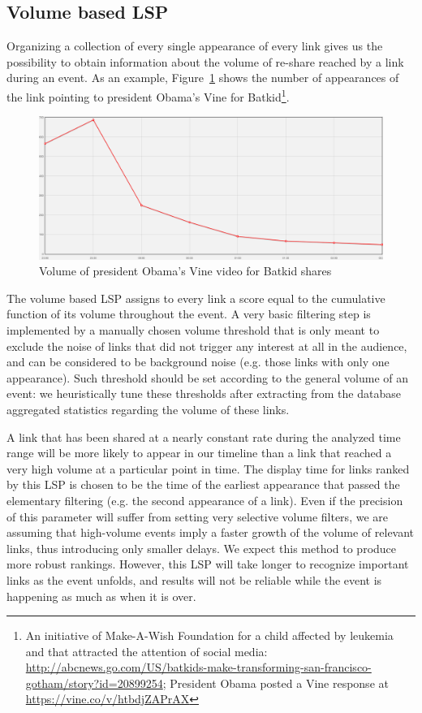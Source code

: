 \documentclass{sig-alternate}
\begin{document}
\subsection{Volume based LSP}
\label{sec:volume_based_links_selection}
Organizing a collection of every single appearance of every link gives us the possibility to obtain information about the volume of re-share reached by a link during an event. As an example, Figure~\ref{fig:batkid_whitehouse_volume} shows the number of appearances of the link pointing to president Obama's Vine for Batkid\footnote{An initiative of Make-A-Wish Foundation for a child affected by leukemia and that attracted the attention of social media: \url{http://abcnews.go.com/US/batkids-make-transforming-san-francisco-gotham/story?id=20899254}; President Obama posted a Vine response at \url{https://vine.co/v/htbdjZAPrAX}}.
\begin{figure}[htbp]
  \centering
  \includegraphics[width=\linewidth]{Figures/batkid_whitehouse_volume.png}
  \caption{Volume of president Obama's Vine video for Batkid shares}
  \label{fig:batkid_whitehouse_volume}
\end{figure}

The volume based LSP assigns to every link a score equal to the cumulative function of its volume throughout the event. A very basic filtering step is implemented by a manually chosen volume threshold that is only meant to exclude the noise of links that did not trigger any interest at all in the audience, and can be considered to be background noise (e.g. those links with only one appearance). Such threshold should be set according to the general volume of an event: we heuristically tune these thresholds after extracting from the database aggregated statistics regarding the volume of these links.

A link that has been shared at a nearly constant rate during the analyzed time range will be more likely to appear in our timeline than a link that reached a very high volume at a particular point in time. The display time for links ranked by this LSP is chosen to be the time of the earliest appearance that passed the elementary filtering (e.g. the second appearance of a link). Even if the precision of this parameter will suffer from setting very selective volume filters, we are assuming that high-volume events imply a faster growth of the volume of relevant links, thus introducing only smaller delays. We expect this method to produce more robust rankings. However, this LSP will take longer to recognize important links as the event unfolds, and results will not be reliable while the event is happening as much as when it is over.
\end{document}
